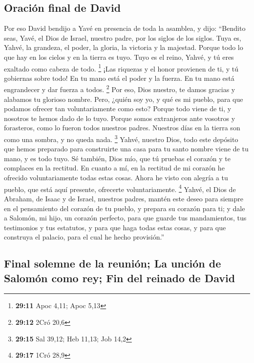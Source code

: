 \begin{paracol}{2}
\hypertarget{oraciuxf3n-final-de-david}{%
\subsection{Oración final de David}\label{oraciuxf3n-final-de-david}}

 Por eso David bendijo a Yavé en presencia de toda la
asamblea, y dijo: ``Bendito seas, Yavé, el Dios de Israel, nuestro
padre, por los siglos de los siglos.  Tuya es, Yahvé, la
grandeza, el poder, la gloria, la victoria y la majestad. Porque todo lo
que hay en los cielos y en la tierra es tuyo. Tuyo es el reino, Yahvé, y
tú eres exaltado como cabeza de todo. \footnote{\textbf{29:11} Apoc
  4,11; Apoc 5,13}  ¡Las riquezas y el honor provienen de
ti, y tú gobiernas sobre todo! En tu mano está el poder y la fuerza. En
tu mano está engrandecer y dar fuerza a todos. \footnote{\textbf{29:12}
  2Cró 20,6}  Por eso, Dios nuestro, te damos gracias y
alabamos tu glorioso nombre.  Pero, ¿quién soy yo, y qué
es mi pueblo, para que podamos ofrecer tan voluntariamente como esto?
Porque todo viene de ti, y nosotros te hemos dado de lo tuyo.
 Porque somos extranjeros ante vosotros y forasteros,
como lo fueron todos nuestros padres. Nuestros días en la tierra son
como una sombra, y no queda nada. \footnote{\textbf{29:15} Sal 39,12;
  Heb 11,13; Job 14,2}  Yahvé, nuestro Dios, todo este
depósito que hemos preparado para construirte una casa para tu santo
nombre viene de tu mano, y es todo tuyo.  Sé también,
Dios mío, que tú pruebas el corazón y te complaces en la rectitud. En
cuanto a mí, en la rectitud de mi corazón he ofrecido voluntariamente
todas estas cosas. Ahora he visto con alegría a tu pueblo, que está aquí
presente, ofrecerte voluntariamente. \footnote{\textbf{29:17} 1Cró 28,9}
 Yahvé, el Dios de Abraham, de Isaac y de Israel,
nuestros padres, mantén este deseo para siempre en el pensamiento del
corazón de tu pueblo, y prepara su corazón para ti;  y
dale a Salomón, mi hijo, un corazón perfecto, para que guarde tus
mandamientos, tus testimonios y tus estatutos, y para que haga todas
estas cosas, y para que construya el palacio, para el cual he hecho
provisión.''

\hypertarget{final-solemne-de-la-reuniuxf3n-la-unciuxf3n-de-salomuxf3n-como-rey-fin-del-reinado-de-david}{%
\subsection{Final solemne de la reunión; La unción de Salomón como rey;
Fin del reinado de
David}\label{final-solemne-de-la-reuniuxf3n-la-unciuxf3n-de-salomuxf3n-como-rey-fin-del-reinado-de-david}}


\end{paracol}

